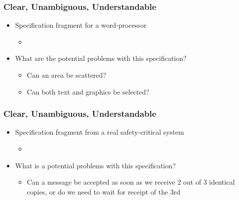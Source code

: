 \documentclass[t,12pt,numbers,fleqn]{beamer}
\begin{document}

\begin{frame}
\frametitle{Clear, Unambiguous, Understandable}

\begin{itemize}

\item Specification fragment for a word-processor
\begin{itemize}
\item {}
\end{itemize}
\item What are the potential problems with this specification?
\begin{itemize}
\item<2-> {\alert{Can an area be scattered?}}
\item<2->{\alert{Can both text and graphics be selected?}}
\end{itemize}
\end{itemize}

\end{frame}


\begin{frame}
\frametitle{Clear, Unambiguous, Understandable}

\begin{itemize}

\item Specification fragment from a real safety-critical system
\begin{itemize}
\item {}
\end{itemize}
\item What is a potential problems with this specification?
\begin{itemize}
\item<2-> {\alert{Can a message be accepted as soon as we receive 2 out of 3
      identical copies, or do we need to wait for receipt of the 3rd}}
\end{itemize}
\end{itemize}

\end{frame}
\end{document}
